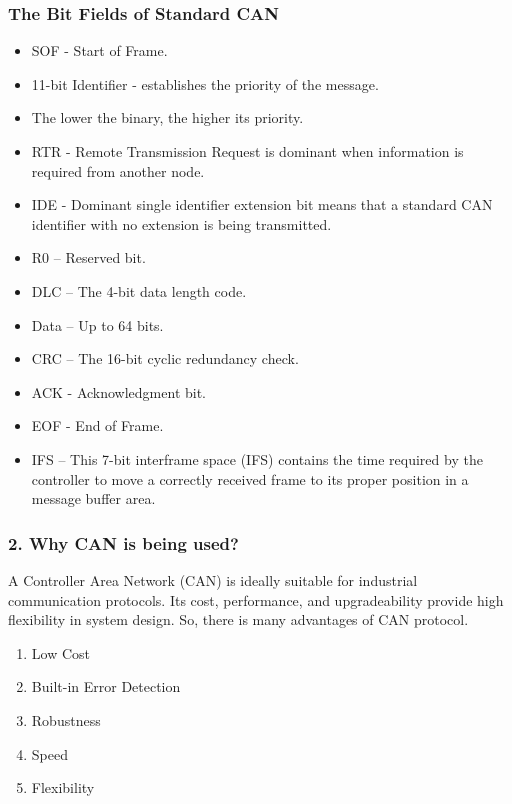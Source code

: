 \subsubsection{The Bit Fields of Standard CAN}
\begin{itemize}
    \item SOF - Start of Frame.
    \item 11-bit Identifier - establishes the priority of the message.
    \item  The lower the binary, the higher its priority.
    \item RTR - Remote Transmission Request is dominant
 when information is required from another node.
    \item IDE - Dominant single identifier extension bit means
 that a standard CAN identifier with no extension is being transmitted. 
 \item R0 – Reserved bit. 
 \item DLC – The 4-bit data length code. 
 \item Data – Up to 64 bits.
 \item CRC – The 16-bit cyclic redundancy check.
 \item ACK - Acknowledgment bit.
 \item EOF - End of Frame. 
 \item IFS – This 7-bit interframe space (IFS) contains the time 
required by the controller to move a correctly received frame 
to its proper position in a message buffer area.
\end{itemize}

\subsubsection{2. Why CAN is being used?}
A Controller Area Network (CAN) is ideally suitable for industrial communication protocols. Its cost, performance, and upgradeability provide high flexibility in system design. So, there is many advantages of CAN protocol.

\begin{enumerate}
    \item Low Cost
    \item Built-in Error Detection
    \item Robustness
    \item Speed
    \item Flexibility
\end{enumerate}

